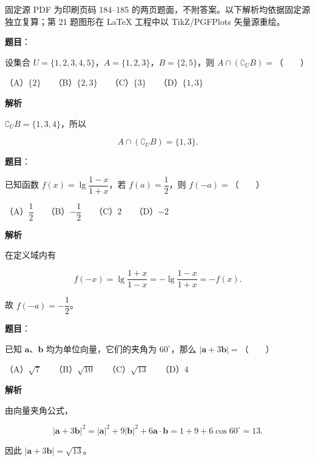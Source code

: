 

\begin{gktip}
固定源 PDF 为印刷页码 184–185 的两页题面，不附答案。以下解析均依据固定源独立复算；第 21 题图形在 LaTeX 工程中以 TikZ/PGFPlots 矢量源重绘。
\end{gktip}

\begin{answer}

\textbf{题目}：

设集合 $U=\{1,2,3,4,5\}$，$A=\{1,2,3\}$，$B=\{2,5\}$，则 $A\cap(\complement_U B)=$\mbox{（　　）}

（A）$\{2\}$　　（B）$\{2,3\}$　　（C）$\{3\}$　　（D）$\{1,3\}$

\textbf{解析}

$\complement_U B=\{1,3,4\}$，所以

\nopagebreak[4]
\[
A\cap(\complement_U B)=\{1,3\}.
\]


\end{answer}
\begin{answer}

\textbf{题目}：

已知函数 $f(x)=\lg\dfrac{1-x}{1+x}$，若 $f(a)=\dfrac12$，则 $f(-a)=$\mbox{（　　）}

（A）$\dfrac12$　　（B）$-\dfrac12$　　（C）$2$　　（D）$-2$

\textbf{解析}

在定义域内有

\nopagebreak[4]
\[
f(-x)=\lg\frac{1+x}{1-x}=-\lg\frac{1-x}{1+x}=-f(x).
\]

故 $f(-a)=-\dfrac12$。


\end{answer}
\begin{answer}

\textbf{题目}：

已知 $\boldsymbol a\text{、}\boldsymbol b$ 均为单位向量，它们的夹角为 $60^\circ$，那么 $|\boldsymbol a+3\boldsymbol b|=$\mbox{（　　）}

（A）$\sqrt7$　　（B）$\sqrt{10}$　　（C）$\sqrt{13}$　　（D）$4$

\textbf{解析}

由向量夹角公式，

\nopagebreak[4]
\[
|\boldsymbol a+3\boldsymbol b|^2
=|\boldsymbol a|^2+9|\boldsymbol b|^2+6\boldsymbol a\cdot\boldsymbol b
=1+9+6\cos60^\circ=13.
\]

因此 $|\boldsymbol a+3\boldsymbol b|=\sqrt{13}$。


\end{answer}
